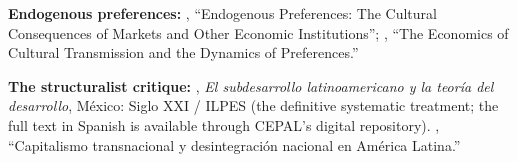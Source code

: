 \documentclass[../structural_economics_book.tex]{subfiles}
\begin{document}
\textbf{Endogenous preferences:} \citet{bowles1998endogenous}, ``Endogenous Preferences: The Cultural Consequences of Markets and Other Economic Institutions''; \citet{bisin2001economics}, ``The Economics of Cultural Transmission and the Dynamics of Preferences.''

\textbf{The structuralist critique:} \citet{sunkel1970subdesarrollo}, \textit{El subdesarrollo latinoamericano y la teor\'{i}a del desarrollo}, M\'{e}xico: Siglo XXI / ILPES (the definitive systematic treatment; the full text in Spanish is available through CEPAL's digital repository). \citet{sunkel1971capitalismo}, ``Capitalismo transnacional y desintegraci\'{o}n nacional en Am\'{e}rica Latina.''
\end{document}
